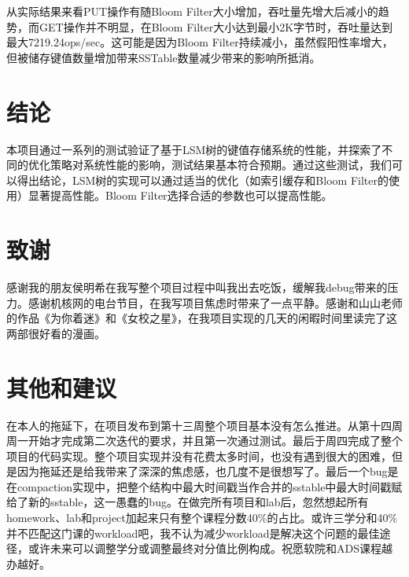 \documentclass[fontset=windows]{article}
\begin{document}
从实际结果来看PUT操作有随Bloom Filter大小增加，吞吐量先增大后减小的趋势，而GET操作并不明显，在Bloom Filter大小达到最小2K字节时，吞吐量达到最大7219.24ops/sec。这可能是因为Bloom Filter持续减小，虽然假阳性率增大，但被储存键值数量增加带来SSTable数量减少带来的影响所抵消。

\section{结论}
本项目通过一系列的测试验证了基于LSM树的键值存储系统的性能，并探索了不同的优化策略对系统性能的影响，测试结果基本符合预期。通过这些测试，我们可以得出结论，LSM树的实现可以通过适当的优化（如索引缓存和Bloom Filter的使用）显著提高性能。Bloom Filter选择合适的参数也可以提高性能。

\section{致谢}
感谢我的朋友侯明希在我写整个项目过程中叫我出去吃饭，缓解我debug带来的压力。感谢机核网的电台节目，在我写项目焦虑时带来了一点平静。感谢和山山老师的作品《为你着迷》和《女校之星》，在我项目实现的几天的闲暇时间里读完了这两部很好看的漫画。

\section{其他和建议}
在本人的拖延下，在项目发布到第十三周整个项目基本没有怎么推进。从第十四周周一开始才完成第二次迭代的要求，并且第一次通过测试。最后于周四完成了整个项目的代码实现。整个项目实现并没有花费太多时间，也没有遇到很大的困难，但是因为拖延还是给我带来了深深的焦虑感，也几度不是很想写了。最后一个bug是在compaction实现中，把整个结构中最大时间戳当作合并的sstable中最大时间戳赋给了新的sstable，这一愚蠢的bug。在做完所有项目和lab后，忽然想起所有homework、lab和project加起来只有整个课程分数40$\%$的占比。或许三学分和40$\%$并不匹配这门课的workload吧，我不认为减少workload是解决这个问题的最佳途径，或许未来可以调整学分或调整最终对分值比例构成。祝愿软院和ADS课程越办越好。
\end{document}
